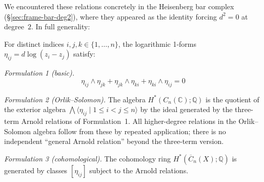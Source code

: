 \begin{theorem}\label{thm:arnold-three}
We encountered these relations concretely in the Heisenberg bar complex (\S\ref{sec:frame-bar-deg2}), where they appeared as the identity forcing $d^2 = 0$ at degree~$2$.  In full generality:

For distinct indices $i, j, k \in \{1, \ldots, n\}$, the logarithmic 1-forms $\eta_{ij} = d\log(z_i - z_j)$ satisfy:

\emph{Formulation 1 (basic).}
\[\eta_{ij} \wedge \eta_{jk} + \eta_{jk} \wedge \eta_{ki} + \eta_{ki} \wedge \eta_{ij} = 0\]

\emph{Formulation 2 (Orlik--Solomon).}
The algebra $H^*(C_n(\mathbb{C}); \mathbb{Q})$ is the quotient of the exterior algebra $\bigwedge\langle \eta_{ij} \mid 1 \le i < j \le n \rangle$ by the ideal generated by the three-term Arnold relations of Formulation~1.  All higher-degree relations in the Orlik--Solomon algebra follow from these by repeated application; there is no independent ``general Arnold relation'' beyond the three-term version.

\emph{Formulation 3 (cohomological).}
The cohomology ring $H^*(\overline{C}_n(X); \mathbb{Q})$ is generated by classes $[\eta_{ij}]$ subject to the Arnold relations.
\end{theorem}

